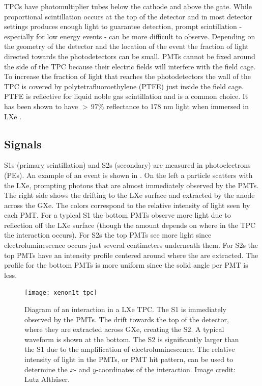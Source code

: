 TPCs have photomultiplier tubes below the cathode and above the gate.  While proportional scintillation occurs at the top of the detector
and in most detector settings produces enough light to guarantee detection, prompt scintillation - especially for low energy events - can
be more difficult to observe.  Depending on the geometry of the detector and the location of the event the fraction of light
directed towards the photodetectors can
be small.  PMTs cannot be fixed around the side of the TPC because their electric fields will interfere with the field
cage.  To increase
the fraction of light that reaches the photodetectors the wall of the TPC is covered by polytetrafluoroethylene (PTFE) just inside the
field cage.  PTFE is reflective for liquid noble gas scintillation and is a common choice.  It has been shown to have ${>}\, 97 \%$
reflectance to 178 nm light when immersed in LXe .



\subsection{Signals}
\label{subsec:tpcs_signals}
S1s (primary scintillation) and S2s (secondary) are measured in photoelectrons (PEs).  An example of an
event is shown in .  On the left a particle scatters with the LXe, prompting photons that are almost
immediately observed by the PMTs.  The right side shows the \electron drifting to the LXe surface and
extracted by the anode across the GXe.  The colors correspond to the relative intensity of light seen by each PMT.  For a typical S1 the
bottom PMTs observe more light due to reflection off the LXe surface (though the amount depends on where in the TPC the interaction
occurs).  For S2s the top PMTs see more light since electroluminescence occurs just several centimeters underneath them.  For S2s
the top PMTs have an intensity profile centered around where the \electron are extracted.  The profile for the bottom PMTs is more
uniform since the solid angle per PMT is less.

\begin{figure}
\centering
\texttt{[image: xenon1t\_tpc]}
\caption[Diagram of an interaction in a LXe TPC.]{Diagram of an interaction in a LXe TPC.  The S1 is immediately
observed by the PMTs.  The \electron drift towards the top of the detector, where they are extracted across GXe,
creating the S2.  A typical waveform is shown at the bottom.  The S2 is significantly
larger than the S1 due to the amplification of electroluminescence.  The relative intensity of light in the PMTs, or PMT hit
pattern, can be used to determine the $x$- and $y$-coordinates of the interaction.  Image credit: Lutz Alth\"{u}ser.}
\label{fig:tpcs_signal_tpc}
\end{figure}



